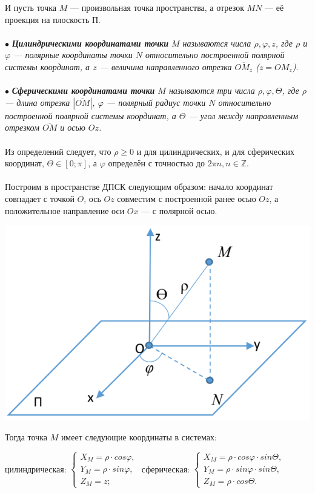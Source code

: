И пусть точка $M$ --- произвольная точка пространства, а отрезок $MN$ --- её проекция на плоскость П.\\\\
$\bullet$ \textit{\textbf{Цилиндрическими координатами точки} $M$ называются числа $\rho, \varphi, z$, где $\rho$ и $\varphi$ --- полярные координаты точки $N$ относительно построенной полярной системы координат, а $z$ --- величина направленного отрезка $\overline{OM_z}$ ($z = OM_z$)}.\\\\
$\bullet$ \textit{\textbf{Сферическими координатами точки} $M$ называются три числа $\rho, \varphi, \Theta$, где $\rho$ --- длина отрезка $|\overline{OM}|$, $\varphi$ --- полярный радиус точки $N$ относительно построенной полярной системы координат, а $\Theta$ --- угол между направленным отрезком $\overline{OM}$ и осью $Oz$.}\\\\
Из определений следует, что $\rho\geqslant0$ и для цилиндрических, и для сферических координат, $\Theta\in [0;\pi]$, а $\varphi$ определён с точностью до $2\pi n, n\in \mathbb{Z}$.\\\\
Построим в пространстве ДПСК следующим образом: начало координат совпадает с точкой $O$, ось $Oz$ совместим с построенной ранее осью $Oz$, а положительное направление оси $Ox$ --- с полярной осью. \begin{center}
	\includegraphics[scale=0.3]{images/pcsk_2.png}
\end{center}
Тогда точка $M$ имеет следующие координаты в системах:\begin{center}
	цилиндрическая: $\begin{cases}
		X_M = \rho\cdot cos\varphi,\\
		Y_M = \rho\cdot sin\varphi,\\
		Z_M = z;
	\end{cases}$ сферическая: $\begin{cases}
		X_M = \rho\cdot cos\varphi\cdot sin\Theta,\\
		Y_M = \rho\cdot sin\varphi\cdot sin\Theta,\\
		Z_M = \rho\cdot cos\Theta.
	\end{cases}$
\end{center}
